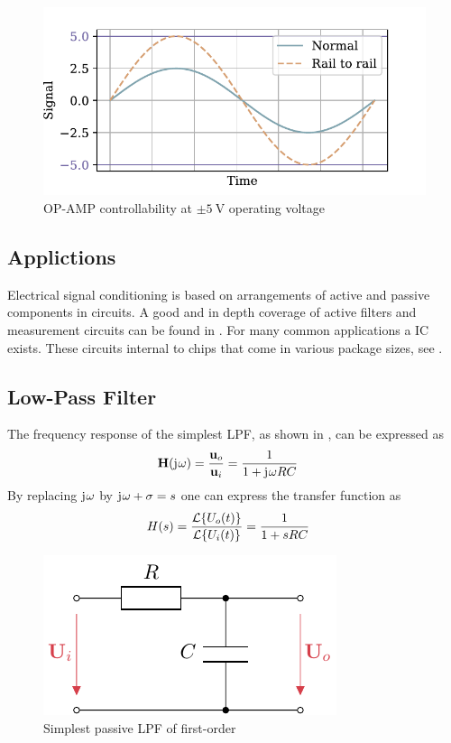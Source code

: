 \begin{figure}[htb!]
    \centering
    \includegraphics[scale=0.72]{figures/electronics/op_amp/plot_opamp_railrail}
    \caption[OP-AMP controllability]{OP-AMP controllability at $\pm\SI{5}{\volt}$ operating voltage}
    \label{fig:plot_opamp_railrail}
\end{figure}

\subsection{Applictions}
Electrical signal conditioning is based on arrangements of active and passive components in circuits. A good and in depth coverage of active filters and measurement circuits can be found in \cite{Tietze2008EC}. For many common applications a \acf{IC} exists. These circuits internal to chips that come in various package sizes, see .

\subsection{Low-Pass Filter}
\cite{Tietze2008EC}

The frequency response of the simplest \ac{LPF}, as shown in , can be expressed as
\begin{align}
    \mathbf{H}(\mathrm{j}\mkern1mu\omega) &= \frac{\mathbf{u}_o}{\mathbf{u}_i} = \frac{1}{1+\mathrm{j}\mkern1mu\omega RC}
\end{align}
By replacing $\mathrm{j}\mkern1mu\omega$ by $\mathrm{j}\mkern1mu\omega+\sigma = s$ one can express the transfer function as
\begin{align}
    H(s) &= \frac{\mathcal{L}\{U_o(t)\}}{\mathcal{L}\{U_i(t)\}} = \frac{1}{1 + sRC}
\end{align}

\begin{figure}[htb!]
    \centering
    \includegraphics[scale=1]{figures/electronics/lowpass/lp_passive_1ord/lp_passive_1ord}
    \caption[Passive first-order \ac{LPF}]{Simplest passive \ac{LPF} of first-order}
    \label{fig:lp_passive_1ord}
\end{figure}

